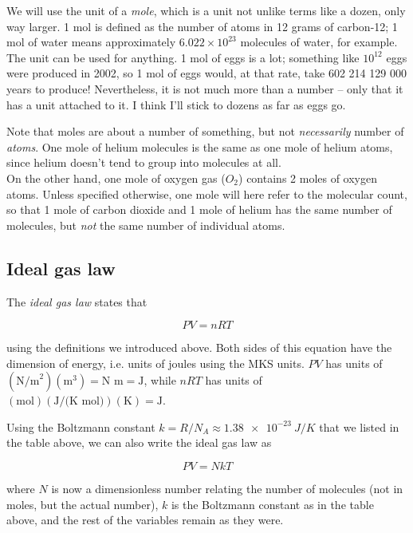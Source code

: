 We will use the unit of a \emph{mole}, which is a unit not unlike terms like a dozen, only way larger. 1 mol is defined as the number of atoms in 12 grams of carbon-12; 1 mol of water means approximately $6.022 \times 10^{23}$ molecules of water, for example. The unit can be used for anything. 1 mol of eggs is a lot; something like $10^{12}$ eggs were produced in 2002, so 1 mol of eggs would, at that rate, take 602 214 129 000 years to produce! Nevertheless, it is not much more than a number -- only that it has a unit attached to it. I think I'll stick to dozens as far as eggs go.

Note that moles are about a number of something, but not \emph{necessarily} number of \emph{atoms}. One mole of helium molecules is the same as one mole of helium atoms, since helium doesn't tend to group into molecules at all.\\
On the other hand, one mole of oxygen gas ($O_2$) contains 2 moles of oxygen atoms. Unless specified otherwise, one mole will here refer to the molecular count, so that 1 mole of carbon dioxide and 1 mole of helium has the same number of molecules, but \emph{not} the same number of individual atoms.

\subsection{Ideal gas law}

The \emph{ideal gas law} states that

\begin{equation}
P V = n R T
\end{equation}

using the definitions we introduced above. Both sides of this equation have the dimension of energy, i.e. units of joules using the MKS units. $P V$ has units of $(\text{N/m}^2)(\text{m}^3) = \text{N m} = \text{J}$, while $n R T$ has units of $(\text{mol})(\text{J/(K mol)})(\text{K}) = \text{J}$.

Using the Boltzmann constant $k = R/N_A \approx \SI{1.38e-23}{J/K}$ that we listed in the table above, we can also write the ideal gas law as

\begin{equation}
P V = N k T
\end{equation}

where $N$ is now a dimensionless number relating the number of molecules (not in moles, but the actual number), $k$ is the Boltzmann constant as in the table above, and the rest of the variables remain as they were.

